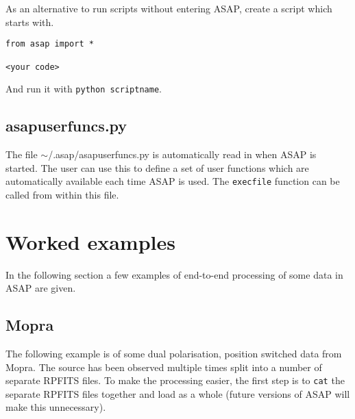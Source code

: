 \documentclass[11pt]{article}
\newcommand{\cmd}[1]{{\tt #1}}
\begin{document}
As an alternative to run scripts without entering ASAP, create a script which
starts with.

\begin{verbatim}
from asap import *

<your code>
\end{verbatim}

And run it with \cmd{python scriptname}.

\subsection{asapuserfuncs.py}

The file $\sim$/.asap/asapuserfuncs.py is automatically read in when
ASAP is started. The user can use this to define a set of user
functions which are automatically available each time ASAP is
used. The \cmd{execfile} function can be called from within this file.

\section{Worked examples}

In the following section a few examples of end-to-end processing of
some data in ASAP are given.

\subsection{Mopra}

The following example is of some dual polarisation, position switched
data from Mopra. The source has been observed multiple times split
into a number of separate RPFITS files. To make the processing easier,
the first step is to \cmd{cat} the separate RPFITS files together and
load as a whole (future versions of ASAP will make this unnecessary).
\end{document}
